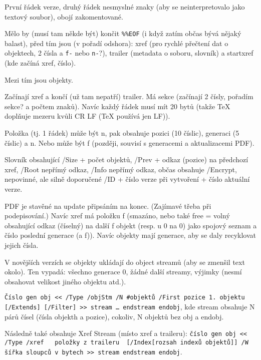 \documentclass[12pt]{article}					%
\begin{document}
        \begin{definice}[Struktura]
            První řádek verze, druhý řádek nesmyslné znaky (aby se neinterpretovalo jako textový soubor), obojí zakomentované.

            Mělo by (musí tam někde být) končit \verb|%%EOF| (i když zatím občas bývá nějaký balast), před tím jsou (v pořadí odshora): xref (pro rychlé přečtení dat o objektech, 2 čísla a \verb|f-| nebo \verb|n-|?), trailer (metadata o soboru, slovník) a startxref (kde začíná xref, číslo).

            Mezi tím jsou objekty.
        \end{definice}

        \begin{definice}[xref]
            Začínají xref a končí (už tam nepatří) trailer. Má sekce (začínají 2 čísly, pořadím sekce? a počtem znaků). Navíc každý řádek musí mít 20 bytů (takže TeX doplňuje mezeru kvůli CR LF (TeX používá jen LF)).

            Položka (tj. 1 řádek) může být n, pak obsahuje pozici (10 číslic), generaci (5 číslic) a n. Nebo může být f (později, souvisí s generacemi a aktualizacemi PDF).
        \end{definice}

        \begin{definice}[trailer]
            Slovník obsahující /Size + počet objektů, /Prev + odkaz (pozice) na předchozí xref, /Root nepřímý odkaz, /Info nepřímý odkaz, občas obsahuje /Encrypt, nepovinné, ale silně doporučené /ID + číslo verze při vytvoření + číslo aktuální verze.
        \end{definice}

        \begin{definice}[Updatování]
                PDF je stavěné na update připsáním na konec. (Zajímavé třeba při podepisování.) Navíc xref má položku f (smazáno, nebo také free = volný obsahující odkaz (číselný) na další f objekt (resp. u 0 na 0) jako spojový seznam a číslo poslední generace (a f)). Navíc objekty mají generace, aby se daly recyklovat jejich čísla.
        \end{definice}

        \begin{definice}
            V novějších verzích se objekty ukládají do object streamů (aby se zmenšil text okolo). Ten vypadá: všechno generace 0, žádné další streamy, výjimky (nesmí obsahovat velikost jiného objektu atd.).

            \verb|Číslo gen obj << /Type /objStm /N #objektů /First pozice 1. objektu [/Extends] [/Filter] >> stream … endstream endobj|, kde stream obsahuje N párů čísel (čísla objekth a pozice), cokoliv, N objektů bez obj a endobj.

            Následně také obsahuje Xref Stream (místo xref a traileru):
            \verb|číslo gen obj << /Type /xref   položky z traileru  [/Index[rozsah indexů objektů]] /W šířka sloupců v bytech >> stream endstream endobj|.
        \end{definice}
\end{document}
